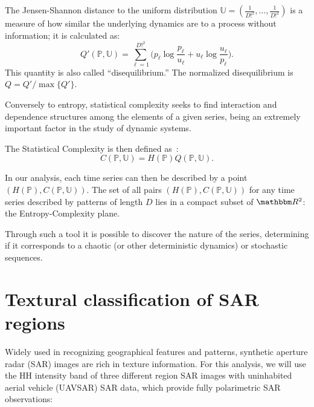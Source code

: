 \documentclass[paper=letter, fontsize=12pt]{article}
\begin{document}
The Jensen-Shannon distance to the uniform distribution $\mathbb{U} = (\frac{1}{D!^2}, \dots, \frac{1}{D!^2})$ is a measure of how similar the underlying dynamics are to a process without information; it is calculated as:
\begin{equation}
Q'(\mathbb{P}, \mathbb{U}) = \sum_{\ell=1}^{D!^2} \Big(p_\ell \log\frac{p_\ell}{u_\ell} +
u_\ell \log\frac{u_\ell}{p_\ell}
\Big).
\end{equation}
This quantity is also called ``disequilibrium.''
The normalized disequilibrium is $ Q=Q'/\max\{Q'\}$.

Conversely to entropy, statistical complexity seeks to find interaction and dependence structures among the elements of a given series, being an extremely important factor in the study of dynamic systems.

The Statistical Complexity is then defined as~\cite{Lamberti2004}:
\begin{equation}
C(\mathbb{P}, \mathbb{U}) = H(\mathbb{P}) Q(\mathbb{P}, \mathbb{U}).
\end{equation}

In our analysis, each time series can then be described by a point $(H(\mathbb{P}), C(\mathbb{P}, \mathbb{U}))$.
The set of all pairs $(H(\mathbb{P}), C(\mathbb{P}, \mathbb{U}))$ for any time series described by patterns of length $D$ lies in a compact subset of $\mathbbm R^2$: the Entropy-Complexity plane. 

Through such a tool it is possible to discover the nature of the series, determining if it corresponds to a chaotic (or other deterministic dynamics) or stochastic sequences.

\section{Textural classification of SAR regions}\label{SAR}

Widely used in recognizing geographical features and patterns, synthetic aperture radar (SAR) images are rich in texture information.
For this analysis, we will use the HH intensity band of three different region SAR images with uninhabited aerial vehicle (UAVSAR) SAR data, which provide fully polarimetric SAR observations:
\end{document}
